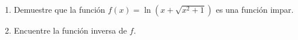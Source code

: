 \item 
\begin{enumerate}
    \item[(a)] Demuestre que la función $f(x) = \ln(x + \sqrt{x^2 + 1})$ es una función impar.
    \item[(b)] Encuentre la función inversa de $f$.
\end{enumerate}
